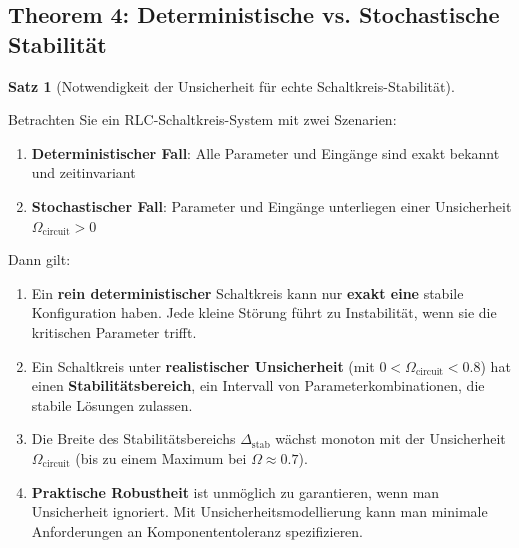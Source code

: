 \documentclass[a4paper, 12pt, twoside, openright]{report}
\theoremstyle{definition}
\theoremstyle{definition}
\newtheorem{satz}{Satz}[chapter]
\begin{document}
\subsection*{Theorem 4: Deterministische vs. Stochastische Stabilität}

\begin{satz}[Notwendigkeit der Unsicherheit für echte Schaltkreis-Stabilität]
\label{satz:notwendige_unsicherheit_circuit}

Betrachten Sie ein RLC-Schaltkreis-System mit zwei Szenarien:

\begin{enumerate}
    \item \textbf{Deterministischer Fall}: Alle Parameter und Eingänge sind exakt bekannt und zeitinvariant
    \item \textbf{Stochastischer Fall}: Parameter und Eingänge unterliegen einer Unsicherheit $\Omega_{\text{circuit}} > 0$
\end{enumerate}

Dann gilt:

\begin{enumerate}
    \item Ein \textbf{rein deterministischer} Schaltkreis kann nur \textbf{exakt eine} stabile Konfiguration haben. Jede kleine Störung führt zu Instabilität, wenn sie die kritischen Parameter trifft.
    
    \item Ein Schaltkreis unter \textbf{realistischer Unsicherheit} (mit $0 < \Omega_{\text{circuit}} < 0.8$) hat einen \textbf{Stabilitätsbereich}, ein Intervall von Parameterkombinationen, die stabile Lösungen zulassen.
    
    \item Die Breite des Stabilitätsbereichs $\Delta_{\text{stab}}$ wächst monoton mit der Unsicherheit $\Omega_{\text{circuit}}$ (bis zu einem Maximum bei $\Omega \approx 0.7$).
    
    \item \textbf{Praktische Robustheit} ist unmöglich zu garantieren, wenn man Unsicherheit ignoriert. Mit Unsicherheitsmodellierung kann man minimale Anforderungen an Komponententoleranz spezifizieren.
\end{enumerate}

\end{satz}
\end{document}
